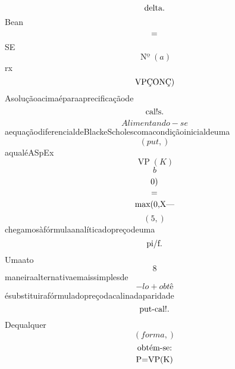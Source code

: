 \documentclass{article}
\begin{document}
\begin{equation}
$delta.$
\end{equation}Bean\begin{equation}
$=$
\end{equation}SE\begin{equation}
\operatorname{Nº}{\left(a \right)}
\end{equation}rx\begin{equation}
$VPÇONÇ)$
\end{equation}Asoluçãoacimaéparaaprecificaçãode\begin{equation}
$cal!s.$
\end{equation}\begin{equation}
Alimentando - se
\end{equation}aequaçãodiferencialdeBlackeScholescomacondiçãoinicialdeuma\begin{equation}
\left( put,\right)
\end{equation}aqualéASpEx\begin{equation}
\operatorname{VP}{\left(K \right)}
\end{equation}\begin{equation}
b
\end{equation}\begin{equation}
$0)$
\end{equation}\begin{equation}
$=$
\end{equation}\begin{equation}
$max(0,X—$
\end{equation}\begin{equation}
\left( 5,\right)
\end{equation}chegamosàfórmulaanalíticadopreçodeuma\begin{equation}
$pi/f.$
\end{equation}Umaato\begin{equation}
8
\end{equation}maneiraalternativaemaissimplesde\begin{equation}
- lo + obtê
\end{equation}ésubstituirafórmuladopreçodacalinadaparidade\begin{equation}
$put-cal!.$
\end{equation}Dequalquer\begin{equation}
\left( forma,\right)
\end{equation}\begin{equation}
$obtém-se:$
\end{equation}\begin{equation}
$P=VP(K)$

\end{equation}
\end{document}
